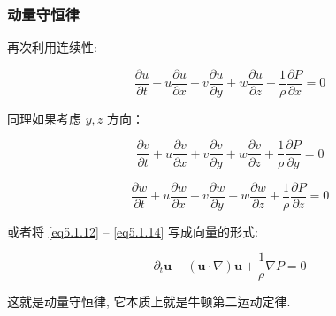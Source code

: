 \documentclass[aspectratio=2516]{beamer}
\begin{document}
\begin{frame}
\frametitle{\kaishu 动量守恒律}

\kaishu 

再次利用连续性:

\begin{equation}
\frac{{\partial u}}{{\partial t}} + u\frac{{\partial u}}{{\partial x}} + v\frac{{\partial u}}{{\partial y}} + w\frac{{\partial u}}{{\partial z}} + \frac{1}{\rho }\frac{{\partial P}}{{\partial x}} = 0
\label{eq5.1.12}
\end{equation}

同理如果考虑 $ y,z $ 方向：

\begin{equation}
\frac{{\partial v}}{{\partial t}} + u\frac{{\partial v}}{{\partial x}} + v\frac{{\partial v}}{{\partial y}} + w\frac{{\partial v}}{{\partial z}} + \frac{1}{\rho }\frac{{\partial P}}{{\partial y}} = 0
\label{eq5.1.13}
\end{equation}

\begin{equation}
\frac{{\partial w}}{{\partial t}} + u\frac{{\partial w}}{{\partial x}} + v\frac{{\partial w}}{{\partial y}} + w\frac{{\partial w}}{{\partial z}} + \frac{1}{\rho }\frac{{\partial P}}{{\partial z}} = 0
\label{eq5.1.14}
\end{equation}

或者将 \ref{eq5.1.12} -- \ref{eq5.1.14} 写成向量的形式:

\begin{equation}
{\partial _t}\boldsymbol{u} + \left( {\boldsymbol{u} \cdot \nabla } \right)\boldsymbol{u} + \frac{1}{\rho }\nabla P = 0
\label{eq5.1.15}
\end{equation}

这就是动量守恒律, 它本质上就是牛顿第二运动定律.
\end{frame}

\end{document}
